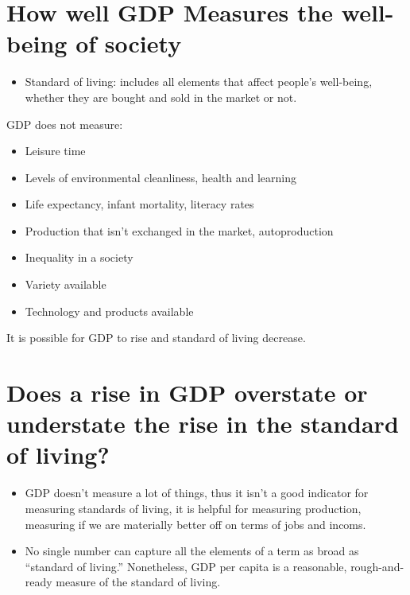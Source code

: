 \documentclass{article}
\begin{document}
\section{How well GDP Measures the well-being of society}
\begin{itemize}
    \item Standard of living: includes all elements that affect people’s well-being, whether they are bought and sold in the market or not. 
\end{itemize}
GDP does not measure: 
\begin{itemize}
    \item Leisure time 
    \item Levels of environmental cleanliness, health and learning
    \item Life expectancy, infant mortality, literacy rates 
    \item Production that isn't exchanged in the market, autoproduction
    \item Inequality in a society 
    \item Variety available 
    \item Technology and products available 
\end{itemize}
It is possible for GDP to rise and standard of living decrease.
\section{Does a rise in GDP overstate or understate the rise in the standard of living?}
\begin{itemize}
    \item GDP doesn't measure a lot of things, thus it isn't a good indicator for measuring standards of living, it is helpful for measuring production, measuring if we are materially better off on terms of jobs and incoms. 
    \item No single number can capture all the elements of a term as broad as “standard of living.” Nonetheless, GDP per capita is a reasonable, rough-and-ready measure of the standard of living.
\end{itemize}



\end{document}

